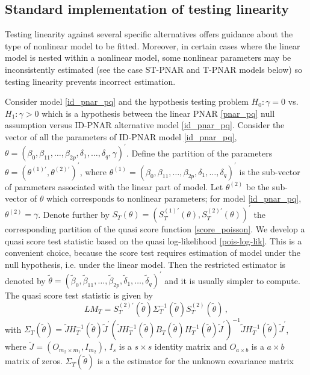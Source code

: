 \subsection{Standard implementation of testing linearity}
\label{subsec test}

Testing linearity against several specific alternatives  offers guidance about  the type of  nonlinear model to be fitted. Moreover, in certain cases where the linear model is nested within a nonlinear model, some nonlinear parameters may be inconsistently estimated (see the case ST-PNAR and T-PNAR models below) %
 so testing linearity prevents  incorrect estimation.

Consider model \eqref{id_pnar_pq} and  the hypothesis testing problem $H_0: \gamma=0$ vs. $H_1: \gamma>0$ which  is a hypothesis  between the linear PNAR \eqref{pnar_pq} null assumption versus ID-PNAR alternative model \eqref{id_pnar_pq}. Consider the vector of all the parameters of ID-PNAR model \eqref{id_pnar_pq}, $\theta=(\beta_0, \beta_{11},\dots, \beta_{2p}, \delta_1,\dots,\delta_q, \gamma)^\prime$. Define the partition of the parameters $\theta=(\theta^{(1)\prime}, \theta^{(2)\prime})^\prime$, where $\theta^{(1)}=(\beta_0, \beta_{11},\dots, \beta_{2p}, \delta_1,\dots,\delta_q)^\prime$ is the sub-vector of parameters associated 
with the linear part of model.   Let   $\theta^{(2)}$ be the  sub-vector of $\theta$ which corresponds  to  nonlinear parameters; for model \eqref{id_pnar_pq}, $\theta^{(2)}=\gamma$.  Denote further by  $S_{T}(\theta)=( S^{(1)\prime}_{T}(\theta), S_{T}^{(2)\prime}(\theta)) ^\prime$ the  corresponding partition of the quasi score function \eqref{score_poisson}.
We develop a quasi score test statistic based on the quasi log-likelihood \eqref{pois-log-lik}. This is a convenient choice, because  the score test requires  estimation of model under the null hypothesis, i.e. under  the linear model. Then the restricted estimator  is denoted by  $\tilde{\theta}=(\tilde{\beta}_0, \tilde{\beta}_{11},\dots, \tilde{\beta}_{2p}, \tilde{\delta}_1,\dots,\tilde{\delta}_q)^\prime$ and it is usually simpler to compute.  The  quasi score test statistic is given by
\begin{equation}
	LM_{T}= S^{(2)\prime}_{T}\left( \tilde{\theta}\right) \Sigma_{T}^{-1}\left( \tilde{\theta}\right)  S^{(2)}_{T}\left( \tilde{\theta}\right) \,,
	\label{score test}
\end{equation}
with $\Sigma_{T}(\tilde{\theta})=\tilde{J} H_T^{-1}(\tilde{\theta}) \tilde{J}^\prime\left( \tilde{J} H_T^{-1}(\tilde{\theta}) B_T(\tilde{\theta}) H_T^{-1}(\tilde{\theta}) \tilde{J}^\prime\right)^{-1} \tilde{J} H_T^{-1}(\tilde{\theta}) \tilde{J}^\prime $, where $\tilde{J}=(O_{m_2\times m_1}, I_{m_2})$, $I_s$ is a $s\times s$ identity matrix and $O_{a\times b}$ is a $a\times b$ matrix of zeros. $\Sigma_{T}(\tilde{\theta})$ is a the estimator for the unknown covariance matrix  
